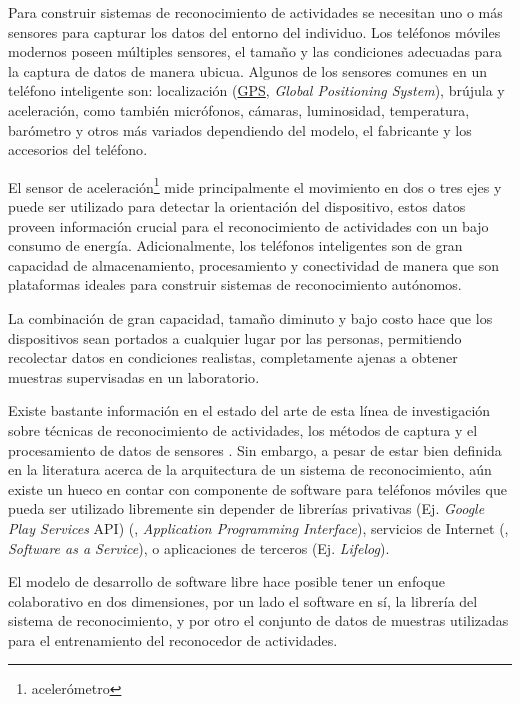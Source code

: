 \label{justificaciuxf3n}

Para construir sistemas de reconocimiento de actividades se necesitan
uno o más sensores para capturar los datos del entorno del individuo.
Los teléfonos móviles modernos poseen múltiples sensores, el tamaño
y las condiciones adecuadas para la captura de datos de manera ubicua.
Algunos de los sensores comunes en un teléfono inteligente son: localización
(\hyperlink{abbr}{GPS}, \emph{Global Positioning System}), brújula
y aceleración, como también micrófonos, cámaras, luminosidad, temperatura,
barómetro y otros más variados dependiendo del modelo, el fabricante
y los accesorios del teléfono\cite{Kwapisz2011}.

El sensor de aceleración\footnote{acelerómetro} mide principalmente
el movimiento en dos o tres ejes y puede ser utilizado para detectar
la orientación del dispositivo, estos datos proveen información crucial
para el reconocimiento de actividades con un bajo consumo de energía.
Adicionalmente, los teléfonos inteligentes son de gran capacidad de
almacenamiento, procesamiento y conectividad de manera que son plataformas
ideales para construir sistemas de reconocimiento autónomos.

La combinación de gran capacidad, tamaño diminuto y bajo costo hace
que los dispositivos sean portados a cualquier lugar por las personas,
permitiendo recolectar datos en condiciones realistas, completamente
ajenas a obtener muestras supervisadas en un laboratorio\cite{Bao2004}. 

Existe bastante información en el estado del arte de esta línea de
investigación sobre técnicas de reconocimiento de actividades, los
métodos de captura y el procesamiento de datos de sensores \cite{LaraLabrador2012,Kwapisz2011}.
Sin embargo, a pesar de estar bien definida en la literatura acerca
de la arquitectura de un sistema de reconocimiento, aún existe un
hueco en contar con componente de software para teléfonos móviles
que pueda ser utilizado libremente sin depender de librerías privativas
(Ej. \emph{Google Play Services} API) (, \emph{Application
Programming Interface}), servicios de Internet (, \emph{Software
as a Service}), o aplicaciones de terceros (Ej. \emph{Lifelog}).

El modelo de desarrollo de software libre hace posible tener un enfoque
colaborativo en dos dimensiones, por un lado el software en sí, la
librería del sistema de reconocimiento, y por otro el conjunto de
datos de muestras utilizadas para el entrenamiento del reconocedor
de actividades.

